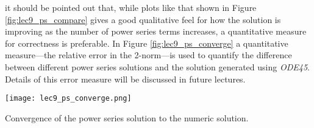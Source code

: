  it should be pointed out that, while plots like that shown in Figure \ref{fig:lec9_ps_compare} gives a good qualitative feel for how the solution is improving as the number of power series terms increases, a quantitative measure for correctness is preferable.  In Figure \ref{fig:lec9_ps_converge} a quantitative measure---the relative error in the 2-norm---is used to quantify the difference between different power series solutions and the solution generated using \emph{ODE45}.  Details of this error measure will be discussed in future lectures.
\begin{marginfigure}
\texttt{[image: lec9\_ps\_converge.png]}
\caption{Convergence of the power series solution to the numeric solution.}
\label{fig:lec9_ps_converge}
\end{marginfigure}   

